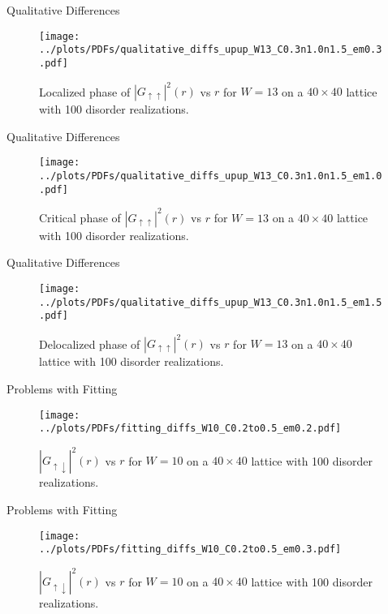 \documentclass[]{beamer}
\begin{document}
\begin{frame}{Qualitative Differences}
    \begin{figure}
        \centering
        \texttt{[image: ../plots/PDFs/qualitative\_diffs\_upup\_W13\_C0.3n1.0n1.5\_em0.3.pdf]}
        \caption{Localized phase of $|G_{\uparrow\uparrow}|^2(r)$ vs $r$ for $W = 13$ on a $40\times40$
                lattice with 100 disorder realizations.}
    \end{figure}        
\end{frame}

\begin{frame}{Qualitative Differences}
    \begin{figure}
        \centering
        \texttt{[image: ../plots/PDFs/qualitative\_diffs\_upup\_W13\_C0.3n1.0n1.5\_em1.0.pdf]}
        \caption{Critical phase of $|G_{\uparrow\uparrow}|^2(r)$ vs $r$ for $W = 13$ on a $40\times40$
                lattice with 100 disorder realizations.}
    \end{figure}        
\end{frame}

\begin{frame}{Qualitative Differences}
    \begin{figure}
        \centering
        \texttt{[image: ../plots/PDFs/qualitative\_diffs\_upup\_W13\_C0.3n1.0n1.5\_em1.5.pdf]}
        \caption{Delocalized phase of $|G_{\uparrow\uparrow}|^2(r)$ vs $r$ for $W = 13$ on a $40\times40$
                lattice with 100 disorder realizations.}
    \end{figure}        
\end{frame}


\begin{frame}{Problems with Fitting}
    \begin{figure}
        \centering
        \texttt{[image: ../plots/PDFs/fitting\_diffs\_W10\_C0.2to0.5\_em0.2.pdf]}
        \caption{$|G_{\uparrow\downarrow}|^2(r)$ vs $r$ for $W = 10$ on a $40\times40$ lattice with 100 disorder realizations.}
    \end{figure}        
\end{frame}

\begin{frame}{Problems with Fitting}
    \begin{figure}
        \centering
        \texttt{[image: ../plots/PDFs/fitting\_diffs\_W10\_C0.2to0.5\_em0.3.pdf]}
        \caption{$|G_{\uparrow\downarrow}|^2(r)$ vs $r$ for $W = 10$ on a $40\times40$ lattice with 100 disorder realizations.}
    \end{figure}        
\end{frame}
\end{document}
